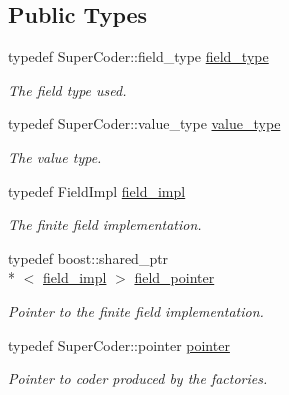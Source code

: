 \subsection*{Public Types}
\begin{DoxyCompactItemize}
\item 
\hypertarget{classkodo_1_1finite__field__math_a3c84e68134e42fcb67bfca6e0ec31d2e}{typedef Super\-Coder\-::field\-\_\-type \hyperlink{classkodo_1_1finite__field__math_a3c84e68134e42fcb67bfca6e0ec31d2e}{field\-\_\-type}}\label{classkodo_1_1finite__field__math_a3c84e68134e42fcb67bfca6e0ec31d2e}

\begin{DoxyCompactList}\small\item\em The field type used. \end{DoxyCompactList}\item 
\hypertarget{classkodo_1_1finite__field__math_a6539f35f436d64698ed6dd7d40ae3ab8}{typedef Super\-Coder\-::value\-\_\-type \hyperlink{classkodo_1_1finite__field__math_a6539f35f436d64698ed6dd7d40ae3ab8}{value\-\_\-type}}\label{classkodo_1_1finite__field__math_a6539f35f436d64698ed6dd7d40ae3ab8}

\begin{DoxyCompactList}\small\item\em The value type. \end{DoxyCompactList}\item 
\hypertarget{classkodo_1_1finite__field__math_ab545cc5e66211178dee755d27b3bb719}{typedef Field\-Impl \hyperlink{classkodo_1_1finite__field__math_ab545cc5e66211178dee755d27b3bb719}{field\-\_\-impl}}\label{classkodo_1_1finite__field__math_ab545cc5e66211178dee755d27b3bb719}

\begin{DoxyCompactList}\small\item\em The finite field implementation. \end{DoxyCompactList}\item 
\hypertarget{classkodo_1_1finite__field__math_adc8809e96febdd3ada1a8eb784aa2da2}{typedef boost\-::shared\-\_\-ptr\\*
$<$ \hyperlink{classkodo_1_1finite__field__math_ab545cc5e66211178dee755d27b3bb719}{field\-\_\-impl} $>$ \hyperlink{classkodo_1_1finite__field__math_adc8809e96febdd3ada1a8eb784aa2da2}{field\-\_\-pointer}}\label{classkodo_1_1finite__field__math_adc8809e96febdd3ada1a8eb784aa2da2}

\begin{DoxyCompactList}\small\item\em Pointer to the finite field implementation. \end{DoxyCompactList}\item 
\hypertarget{classkodo_1_1finite__field__math_af9c063c54c2f031abe47b2aa66f0e32a}{typedef Super\-Coder\-::pointer \hyperlink{classkodo_1_1finite__field__math_af9c063c54c2f031abe47b2aa66f0e32a}{pointer}}\label{classkodo_1_1finite__field__math_af9c063c54c2f031abe47b2aa66f0e32a}

\begin{DoxyCompactList}\small\item\em Pointer to coder produced by the factories. \end{DoxyCompactList}\end{DoxyCompactItemize}
